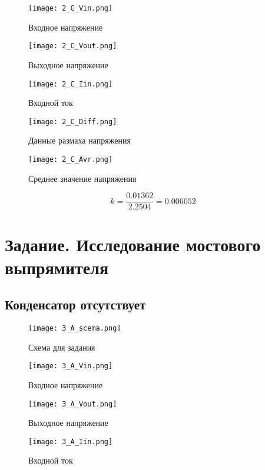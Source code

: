 \documentclass[a4paper,14pt]{article}
\begin{document}
\begin{figure}[H]
	\centering
	\texttt{[image: 2\_C\_Vin.png]}
	\caption{Входное напряжение}	
\end{figure}

\begin{figure}[H]
	\centering
	\texttt{[image: 2\_C\_Vout.png]}
	\caption{Выходное напряжение}	
\end{figure}

\begin{figure}[H]
	\centering
	\texttt{[image: 2\_C\_Iin.png]}
	\caption{Входной ток}	
\end{figure}

\begin{figure}[H]
	\centering
	\texttt{[image: 2\_C\_Diff.png]}
	\caption{Данные размаха напряжения}	
\end{figure}

\begin{figure}[H]
	\centering
	\texttt{[image: 2\_C\_Avr.png]}
	\caption{Среднее значение напряжения}	
\end{figure}

$$k = \frac{0.01362}{2.2504} = 0.006052$$

\section{Задание. Исследование мостового выпрямителя}

\subsection{Конденсатор отсутствует}
\begin{figure}[H]
	\centering
	\texttt{[image: 3\_A\_scema.png]}
	\caption{Схема для задания}	
\end{figure}

\begin{figure}[H]
	\centering
	\texttt{[image: 3\_A\_Vin.png]}
	\caption{Входное напряжение}	
\end{figure}

\begin{figure}[H]
	\centering
	\texttt{[image: 3\_A\_Vout.png]}
	\caption{Выходное напряжение}	
\end{figure}

\begin{figure}[H]
	\centering
	\texttt{[image: 3\_A\_Iin.png]}
	\caption{Входной ток}	
\end{figure}
\end{document}
